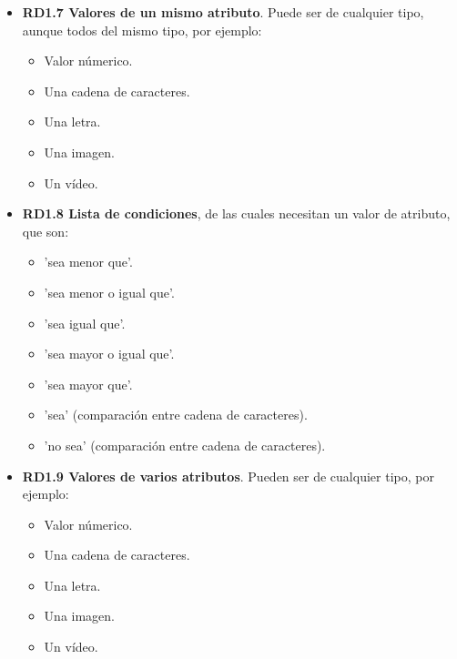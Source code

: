 \begin{itemize}
	\item \textbf{RD1.7 Valores de un mismo atributo}. Puede ser de cualquier tipo, aunque todos del mismo tipo, por ejemplo:
	\begin{itemize}
		\item Valor númerico.
		\item Una cadena de caracteres.
		\item Una letra.
		\item Una imagen.
		\item Un vídeo.
	\end{itemize}
	
	\item \textbf{RD1.8 Lista de condiciones}, de las cuales necesitan un valor de atributo, que son:
	\begin{itemize}
		\item 'sea menor que'.
		\item 'sea menor o igual que'.
		\item 'sea igual que'.
		\item 'sea mayor o igual que'.
		\item 'sea mayor que'.
		\item 'sea' (comparación entre cadena de caracteres).
		\item 'no sea' (comparación entre cadena de caracteres).
	\end{itemize}
	
	\item \textbf{RD1.9 Valores de varios atributos}. Pueden ser de cualquier tipo, por ejemplo:
	\begin{itemize}
		\item Valor númerico.
		\item Una cadena de caracteres.
		\item Una letra.
		\item Una imagen.
		\item Un vídeo.
	\end{itemize}
\end{itemize}





